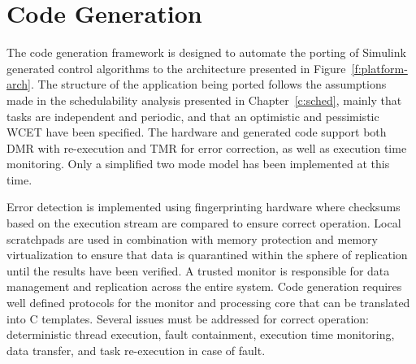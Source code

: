 
\chapter{Code Generation} %
\label{c:code-gen}


	The code generation framework is designed to automate the porting of Simulink generated control algorithms to the architecture presented in Figure~\ref{f:platform-arch}. 
	The structure of the application being ported follows the assumptions made in the schedulability analysis presented in Chapter~\ref{c:sched}, mainly that tasks are independent and periodic, and that an optimistic and pessimistic WCET have been specified. 
	The hardware and generated code support both DMR with re-execution and TMR for error correction, as well as execution time monitoring. 
	Only a simplified two mode model has been implemented at this time.
	
	
	
	Error detection is implemented using fingerprinting hardware where checksums based on the execution stream are compared to ensure correct operation.
	Local scratchpads are used in combination with memory protection and memory virtualization to ensure that data is quarantined within the sphere of replication until the results have been verified.
	A trusted monitor is responsible for data management and replication across the entire system.
	Code generation requires well defined protocols for the monitor and processing core that can be translated into C templates. 
	Several issues must be addressed for correct operation: deterministic thread execution, fault containment, execution time monitoring, data transfer, and task re-execution in case of fault. 
		
